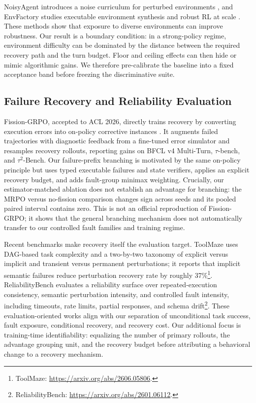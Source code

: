 NoisyAgent introduces a noise curriculum for perturbed environments
\citep{chen2026noisyagent}, and EnvFactory studies executable environment
synthesis and robust RL at scale \citep{xu2026envfactory}. These methods show
that exposure to diverse environments can improve robustness. Our result is a
boundary condition: in a strong-policy regime, environment difficulty can be
dominated by the distance between the required recovery path and the turn
budget. Floor and ceiling effects can then hide or mimic algorithmic gains. We
therefore pre-calibrate the baseline into a fixed acceptance band before
freezing the discriminative suite.

\subsection{Failure Recovery and Reliability Evaluation}

Fission-GRPO, accepted to ACL 2026, directly trains recovery by converting
execution errors into on-policy corrective instances
\citep{zhang2026fissiongrpo}. It augments failed trajectories with diagnostic
feedback from a fine-tuned error simulator and resamples recovery rollouts,
reporting gains on BFCL v4 Multi-Turn, $\tau$-bench, and $\tau^2$-Bench. Our
failure-prefix branching is motivated by the same on-policy principle but uses
typed executable failures and state verifiers, applies an explicit recovery
budget, and adds fault-group minimax weighting. Crucially, our estimator-matched
ablation does not establish an advantage for branching: the MRPO versus
no-fission comparison changes sign across seeds and its pooled paired interval
contains zero. This is not an official reproduction of Fission-GRPO; it shows
that the general branching mechanism does not automatically transfer to our
controlled fault families and training regime.

Recent benchmarks make recovery itself the evaluation target. ToolMaze uses
DAG-based task complexity and a two-by-two taxonomy of explicit versus implicit
and transient versus permanent perturbations; it reports that implicit semantic
failures reduce perturbation recovery rate by roughly 37\%\footnote{ToolMaze:
\url{https://arxiv.org/abs/2606.05806}.}. ReliabilityBench evaluates a reliability
surface over repeated-execution consistency, semantic perturbation intensity,
and controlled fault intensity, including timeouts, rate limits, partial
responses, and schema drift\footnote{ReliabilityBench:
\url{https://arxiv.org/abs/2601.06112}.}. These evaluation-oriented works align
with our separation of unconditional task success, fault exposure, conditional
recovery, and recovery cost. Our additional focus is training-time
identifiability: equalizing the number of primary rollouts, the advantage
grouping unit, and the recovery budget before attributing a behavioral change
to a recovery mechanism.

